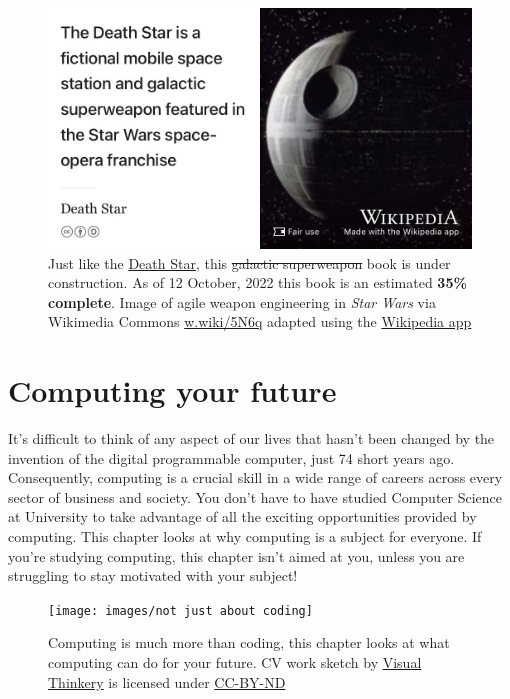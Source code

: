 \documentclass[
]{book}
\begin{document}
\begin{figure}

{\centering \includegraphics[width=0.99\linewidth]{images/DeathStar2} 

}

\caption{Just like the \href{https://en.wikipedia.org/wiki/Death_Star}{Death Star}, this \sout{galactic superweapon} book is under construction. As of 12 October, 2022 this book is an estimated \textbf{35\% complete}. Image of agile weapon engineering in \emph{Star Wars} via Wikimedia Commons \href{https://w.wiki/5N6q}{w.wiki/5N6q} adapted using the \href{https://apps.apple.com/gb/app/wikipedia/id324715238}{Wikipedia app}}\label{fig:deathstar2-fig}
\end{figure}

\hypertarget{computing}{%
\chapter{Computing your future}\label{computing}}

It's difficult to think of any aspect of our lives that hasn't been changed by the invention of the digital programmable computer, just 74 short years ago. \citep{lavington} Consequently, computing is a crucial skill in a wide range of careers across every sector of business and society. You don't have to have studied Computer Science at University to take advantage of all the exciting opportunities provided by computing. This chapter looks at why computing is a subject for everyone. If you're studying computing, this chapter isn't aimed at you, unless you are struggling to stay motivated with your subject! 👨🏿‍💻👨‍💻👩🏽‍💻👩‍💻👨🏿‍💻

\begin{figure}

{\centering \texttt{[image: images/not just about coding]} 

}

\caption{Computing is much more than coding, this chapter looks at what computing can do for your future. CV work sketch by \href{https://visualthinkery.com}{Visual Thinkery} is licensed under \href{https://creativecommons.org/licenses/by-nd/4.0/}{CC-BY-ND}}\label{fig:not-coding-fig}
\end{figure}
\end{document}
